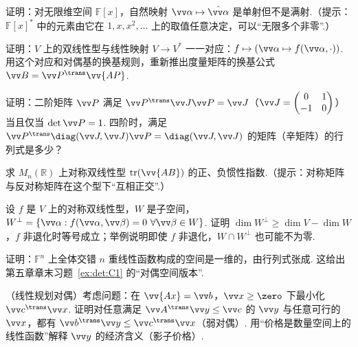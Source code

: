 {		\Cgroup
		\begin{exC}
			\item\label{ex:bil:C1} 证明：对无限维空间 $\mathbb{F}[x]$，自然映射 $\vv\alpha\mapsto\hat{\vv\alpha}$ 是单射但不是满射.（提示：$\mathbb{F}[x]^*$ 中的元素由它在 $1,x,x^2,\ldots$ 上的取值任意决定，可以“无限多个非零”.）
			\item\label{ex:bil:C2} 证明：$V$ 上的双线性型与线性映射 $V\to V^*$ 一一对应：$f\mapsto(\vv\alpha\mapsto f(\vv\alpha,\cdot))$. 用这个对应和对偶基的换基规则，重新推出度量矩阵的换基公式 $\vv B=\vv P^\trans\vv{AP}$.
			\item\label{ex:bil:C3} 证明：二阶矩阵 $\vv P$ 满足 $\vv P^\trans\vv J\vv P=\vv J$（$\vv J=\begin{pmatrix}0&1\\-1&0\end{pmatrix}$）当且仅当 $\det\vv P=1$. 四阶时，满足 $\vv P^\trans\diag(\vv J,\vv J)\vv P=\diag(\vv J,\vv J)$ 的矩阵（辛矩阵）的行列式是多少？
			\item\label{ex:bil:C4} 求 $M_n(\mathbb{R})$ 上对称双线性型 $\tr(\vv{AB})$ 的正、负惯性指数.（提示：对称矩阵与反对称矩阵在这个型下“互相正交”.）
			\item\label{ex:bil:C5} 设 $f$ 是 $V$ 上的对称双线性型，$W$ 是子空间，$W^\perp=\{\vv\alpha:f(\vv\alpha,\vv\beta)=0\ \forall\vv\beta\in W\}$. 证明 $\dim W^\perp\ge\dim V-\dim W$，$f$ 非退化时等号成立；举例说明即使 $f$ 非退化，$W\cap W^\perp$ 也可能不为零.
			\item\label{ex:bil:C6} 证明：$\mathbb{F}^n$ 上全体交错 $n$ 重线性函数构成的空间是一维的，由行列式张成. 这给出第五章章末习题~\ref{ex:det:C1} 的“对偶空间版本”.
			\item\label{ex:bil:C7} （线性规划对偶）考虑问题：在 $\vv{Ax}=\vv b$，$\vv x\ge\zero$ 下最小化 $\vv c^\trans\vv x$. 证明对任意满足 $\vv A^\trans\vv y\le\vv c$ 的 $\vv y$ 与任意可行的 $\vv x$，都有 $\vv b^\trans\vv y\le\vv c^\trans\vv x$（弱对偶）. 用“价格是数量空间上的线性函数”解释 $\vv y$ 的经济含义（影子价格）.
		\end{exC}
	}